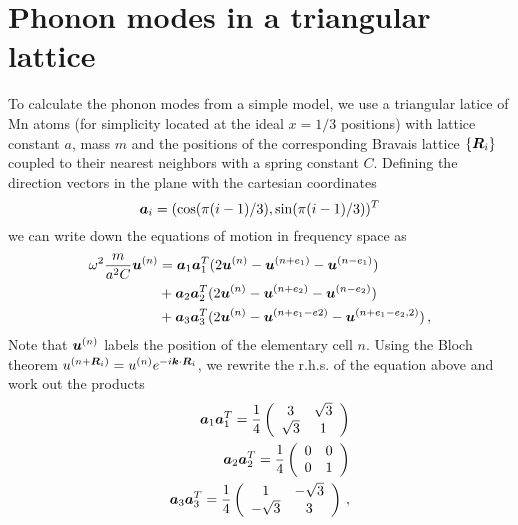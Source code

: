 \documentclass[aps,prl,twocolumn,superscriptaddress,amsmath,amssymb,floats,aps,10pt]{revtex4-1}
\begin{document}
\section{Phonon modes in a triangular lattice}
To calculate the phonon modes from a simple model, we use a triangular latice of Mn atoms (for simplicity located at the
ideal $x=1/3$ positions) with lattice constant $a$, mass $m$ and the positions of the
corresponding Bravais lattice $\{ \bm{R}_i \}$ coupled to their nearest neighbors with a spring constant $C$.
Defining the direction vectors  in the plane with the cartesian coordinates
\begin{equation}
\bm a_i=(\cos(\pi(i-1)/3),\sin(\pi(i-1)/3))^T\label{eq_NNvectors}
\end{equation}
we can write down the equations of motion
in frequency space as
\begin{align}
 \omega^2 \frac{m}{a^2 C} \bm u^{(n)}&=\bm a_1 \bm a_1^T(2\bm u^{(n)}-\bm u  ^{(n+e_1)}-\bm u^{(n-e_1)})\notag\\
 &+\bm a_2 \bm a_2^T(2\bm u^{(n)}- \bm u^{(n+e_2)}-\bm u^{(n-e_2)})\notag\\
  &+\bm a_3 \bm a_3^T(2\bm u^{(n)}- \bm u^{(n+e_1-e2)}-\bm u^{(n+e_1-e_2,2)})\,,
\end{align}
Note that $\bm u^{(n)}$ labels the position of the elementary cell $n$.
Using the Bloch theorem $u^{(n+ \bm{R}_i)}=u^{(n)} e^{-i\bm k\cdot  \bm{R}_i }$, we rewrite the r.h.s. of the equation above and work out the products
\begin{subequations}
 \begin{align}
  \bm a_1 \bm a_1^T=\frac{1} 4\left(\begin{array}{cc}
                           3&\sqrt 3\\
                           \sqrt 3&1
                          \end{array}\right)\\
  \bm a_2 \bm a_2^T=\frac 14 \left(\begin{array}{cc}
                           0&0\\
                           0&1
                          \end{array}\right)\\
  \bm a_3 \bm a_3^T=\frac 14 \left(\begin{array}{cc}
                           1&-\sqrt 3\\
                           -\sqrt 3&3
                          \end{array}\right)\,,
 \end{align}
\end{subequations}
\end{document}
